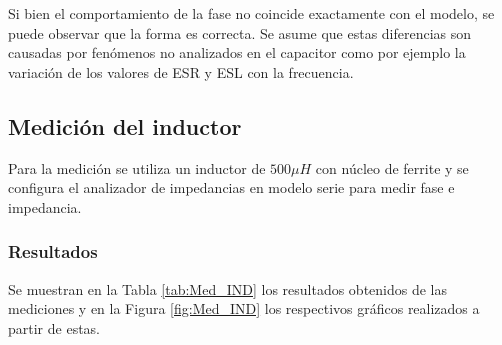 Si bien el comportamiento de la fase no coincide exactamente con el modelo, se puede observar que la forma es correcta. Se asume que estas diferencias son causadas por fen\'omenos no analizados en el capacitor como por ejemplo la variaci\'on de los valores de ESR y ESL con la frecuencia.

\subsection{Medici\'on del inductor}
Para la medici\'on se utiliza un inductor de $500\mu H$ con n\'ucleo de ferrite y se configura el analizador de impedancias en modelo serie para medir fase e impedancia. 
\subsubsection{Resultados}
Se muestran en la Tabla \ref{tab:Med_IND}  los resultados obtenidos de las mediciones y en la Figura \ref{fig:Med_IND} los respectivos  gr\'aficos realizados a partir de estas.
